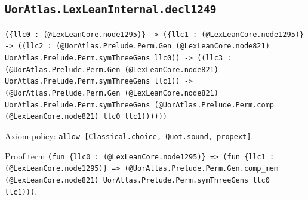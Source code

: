 \documentclass[11pt]{article}
\begin{document}
\subsection*{\texttt{UorAtlas.LexLeanInternal.decl1249}}
\noindent\texttt{(\{llc0 : (@LexLeanCore.node1295)\} -> (\{llc1 : (@LexLeanCore.node1295)\} -> ((llc2 : (@UorAtlas.Prelude.Perm.Gen (@LexLeanCore.node821) UorAtlas.Prelude.Perm.symThreeGens llc0)) -> ((llc3 : (@UorAtlas.Prelude.Perm.Gen (@LexLeanCore.node821) UorAtlas.Prelude.Perm.symThreeGens llc1)) -> (@UorAtlas.Prelude.Perm.Gen (@LexLeanCore.node821) UorAtlas.Prelude.Perm.symThreeGens (@UorAtlas.Prelude.Perm.comp (@LexLeanCore.node821) llc0 llc1))))))}\par
\noindent Axiom policy: \texttt{allow [Classical.choice, Quot.sound, propext]}.\par
\noindent Proof term \texttt{(fun \{llc0 : (@LexLeanCore.node1295)\} => (fun \{llc1 : (@LexLeanCore.node1295)\} => (@UorAtlas.Prelude.Perm.Gen.comp\_mem (@LexLeanCore.node821) UorAtlas.Prelude.Perm.symThreeGens llc0 llc1)))}.\par
\end{document}
